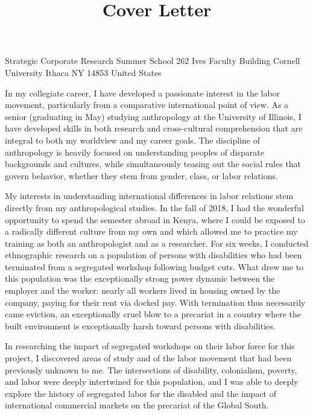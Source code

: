\title{Cover Letter}

\maketitle

\toaddress
    {Strategic Corporate Research Summer School}
    {262 Ives Faculty Building}
    {Cornell University}
    {Ithaca}
    {NY}
    {14853}
    {United States}

\noindent
In my collegiate career, I have developed a passionate interest in the labor movement,
particularly from a comparative international point of view.
As a senior (graduating in May) studying anthropology at the University of Illinois,
I have developed skills in both research and cross-cultural comprehension that are
integral to both my worldview and my career goals. The discipline of anthropology
is heavily focused on understanding peoples of disparate backgrounds and cultures,
while simultaneously teasing out the social rules that govern behavior, whether they
stem from gender, class, or labor relations.

My interests in understanding international differences in labor relations
stem directly from my anthropological studies.
In the fall of 2018, I had the wonderful opportunity to spend the semester abroad
in Kenya, where I could be exposed to a radically different culture from my own
and which allowed me to practice my training as both an anthropologist and as a researcher.
For six weeks, I conducted ethnographic research on a population of persons with
disabilities who had been terminated from a segregated workshop following budget cuts.
What drew me to this population was the exceptionally strong power dynamic between the
employer and the worker: nearly all workers lived in housing owned by the company,
paying for their rent via docked pay. With termination thus necessarily came eviction,
an exceptionally cruel blow to a precariat in a country where the built environment is
exceptionally harsh toward persons with disabilities.

In researching the impact of segregated workshops on their labor force for this project,
I discovered areas of study and of the labor movement that had been previously unknown to me.
The intersections of disability, colonialism, poverty, and labor were deeply intertwined
for this population, and I was able to deeply explore the history of segregated labor for
the disabled and the impact of international commercial markets on the precariat of the Global South.

